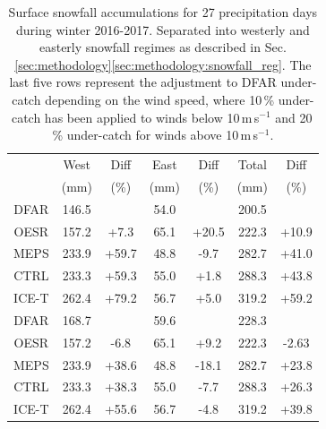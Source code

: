 \documentclass{ametsocV5}
\begin{document}
\begin{table}[t]
    \caption{Surface snowfall accumulations for 27 precipitation days during winter 2016-2017. Separated into westerly and easterly snowfall regimes as described in Sec. \ref{sec:methodology}\ref{sec:methodology:snowfall_reg}. 
    The last five rows represent the adjustment to DFAR under-catch depending on the wind speed, where 10\,\% under-catch has been applied to winds below 10\,m\,s$^{-1}$ and 20\,\% under-catch for winds above 10\,m\,s$^{-1}$.
    }
    \label{tab:sfc_acc}
    \begin{center}
        \begin{tabular}{c||c|c|c|c|c|c}\hline\hline
         & West & Diff & East & Diff & Total & Diff  \\
         & (mm) & (\%) & (mm) & (\%) & (mm)  & (\%)   \\ \hline
         DFAR & 146.5 & & 54.0 & & 200.5 & \\\hline
        OESR & 157.2 & +7.3 & 65.1 & +20.5 & 222.3 & +10.9  \\\hline
        MEPS & 233.9 & +59.7 & 48.8 & -9.7 & 282.7 & +41.0  \\\hline
        CTRL & 233.3 & +59.3 & 55.0 & +1.8 & 288.3 & +43.8  \\\hline
        ICE-T & 262.4 & +79.2 & 56.7 & +5.0 & 319.2 & +59.2  \\\hline \hline
        DFAR & 168.7 & & 59.6 & & 228.3 & \\\hline
        OESR & 157.2 & -6.8 & 65.1 & +9.2 & 222.3 & -2.63  \\\hline
        MEPS & 233.9 & +38.6 & 48.8 & -18.1 & 282.7 & +23.8  \\\hline
        CTRL & 233.3 & +38.3 & 55.0 & -7.7 & 288.3 & +26.3  \\\hline
        ICE-T & 262.4 & +55.6 & 56.7 & -4.8 & 319.2 & +39.8  \\\hline 
        
    \end{tabular}
    \end{center}
\end{table}

\end{document}

